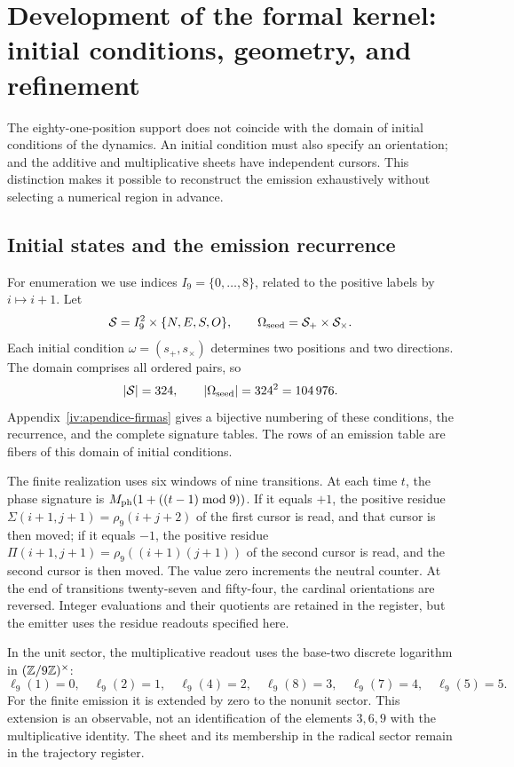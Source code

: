 \section{Development of the formal kernel: initial conditions, geometry, and refinement}
\label{sec:extension}

The eighty-one-position support does not coincide with the domain of initial conditions of the dynamics. An initial condition must also specify an orientation; and the additive and multiplicative sheets have independent cursors. This distinction makes it possible to reconstruct the emission exhaustively without selecting a numerical region in advance.

\subsection{Initial states and the emission recurrence}

For enumeration we use indices \(I_9=\{0,\ldots,8\}\), related to the positive labels by \(i\mapsto i+1\). Let
\[
 \mathcal S=I_9^2\times\{N,E,S,O\},\qquad
 \Omega_{\rm seed}=\mathcal S_+\times\mathcal S_\times.
\]
Each initial condition \(\omega=(s_+,s_\times)\) determines two positions and two directions. The domain comprises all ordered pairs, so
\begin{equation}
 |\mathcal S|=324,\qquad |\Omega_{\rm seed}|=324^2=104\,976.
 \label{eq:semillas}
\end{equation}
Appendix~\ref{iv:apendice-firmas} gives a bijective numbering
of these conditions, the recurrence, and the complete signature tables.
The rows of an emission table are fibers of this domain of initial conditions.

The finite realization uses six windows of nine transitions. At each time \(t\), the phase signature is \(M_{\rm ph}(1+((t-1)\bmod9))\). If it equals \(+1\), the positive residue \(\Sigma(i+1,j+1)=\rho_9(i+j+2)\) of the first cursor is read, and that cursor is then moved; if it equals \(-1\), the positive residue \(\Pi(i+1,j+1)=\rho_9((i+1)(j+1))\) of the second cursor is read, and the second cursor is then moved. The value zero increments the neutral counter. At the end of transitions twenty-seven and fifty-four, the cardinal orientations are reversed. Integer evaluations and their quotients are retained in the register, but the emitter uses the residue readouts specified here.

In the unit sector, the multiplicative readout uses the base-two discrete logarithm in \((\mathbb Z/9\mathbb Z)^\times\):
\[
 \ell_9(1)=0,\quad\ell_9(2)=1,\quad\ell_9(4)=2,\quad
 \ell_9(8)=3,\quad\ell_9(7)=4,\quad\ell_9(5)=5.
\]
For the finite emission it is extended by zero to the nonunit sector. This extension is an observable, not an identification of the elements \(3,6,9\) with the multiplicative identity. The sheet and its membership in the radical sector remain in the trajectory register.

